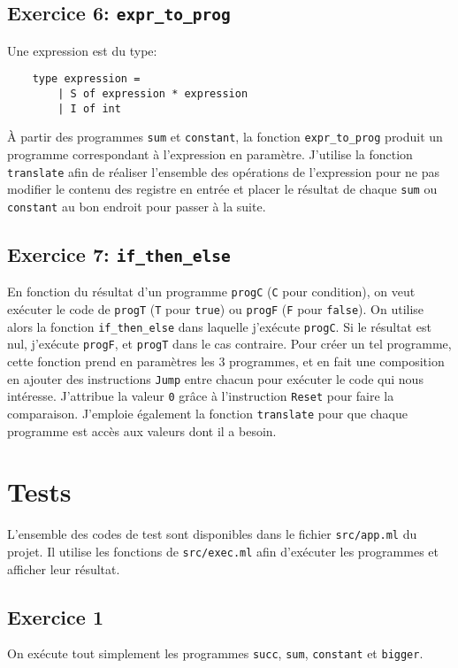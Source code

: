 \documentclass[11pt, a4paper, twoside, titlepage]{article}
\begin{document}
\subsection{Exercice 6: \texttt{expr\_to\_prog}}
Une expression est du type:
\begin{lstlisting}
	type expression =
		| S of expression * expression
		| I of int
\end{lstlisting}
À partir des programmes \texttt{sum} et \texttt{constant}, la fonction \texttt{expr\_to\_prog} produit un programme correspondant à l'expression en paramètre. J'utilise la fonction \texttt{translate} afin de réaliser l'ensemble des opérations de l'expression pour ne pas modifier le contenu des registre en entrée et placer le résultat de chaque \texttt{sum} ou \texttt{constant} au bon endroit pour passer à la suite.

\subsection{Exercice 7: \texttt{if\_then\_else}}
En fonction du résultat d'un programme \texttt{progC} (\texttt{C} pour condition), on veut exécuter le code de \texttt{progT} (\texttt{T} pour \texttt{true}) ou \texttt{progF} (\texttt{F} pour \texttt{false}).
On utilise alors la fonction \texttt{if\_then\_else} dans laquelle j'exécute \texttt{progC}. Si le résultat est nul, j'exécute \texttt{progF}, et \texttt{progT} dans le cas contraire. Pour créer un tel programme, cette fonction prend en paramètres les 3 programmes, et en fait une composition en ajouter des instructions \texttt{Jump} entre chacun pour exécuter le code qui nous intéresse. J'attribue la valeur \texttt{0} grâce à l'instruction \texttt{Reset} pour faire la comparaison. J'emploie également la fonction \texttt{translate} pour que chaque programme est accès aux valeurs dont il a besoin.

\section{Tests}
L'ensemble des codes de test sont disponibles dans le fichier \texttt{src/app.ml} du projet. Il utilise les fonctions de \texttt{src/exec.ml} afin d'exécuter les programmes et afficher leur résultat.

\subsection{Exercice 1}
On exécute tout simplement les programmes \texttt{succ}, \texttt{sum}, \texttt{constant} et \texttt{bigger}.
\end{document}
